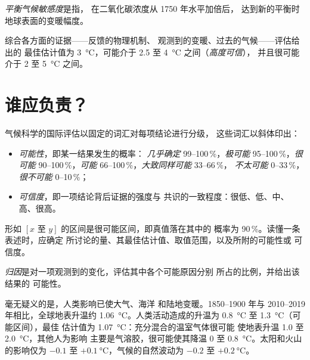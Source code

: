 \begin{definition}[平衡气候敏感度]\label{def:g12:climate-change:ecs}
\emph{平衡气候敏感度}是指，
在二氧化碳浓度从 1750 年水平加倍后，
达到新的平衡时地球表面的变暖幅度。
\end{definition}

\begin{proposition}[气候有多敏感？]\label{prop:g12:climate-change:ecs}
综合各方面的证据——反馈的物理机制、
观测到的变暖、过去的气候——评估给出的
最佳估计值为 \qty{3}{\degreeCelsius}，可能介于
2.5 至 \qty{4}{\degreeCelsius} 之间（\emph{高度可信}），
并且很可能介于 2 至 \qty{5}{\degreeCelsius} 之间。
\end{proposition}

\section{谁应负责？}

\begin{method}[解读评估中的表述]\label{met:g12:climate-change:language}
气候科学的国际评估以固定的词汇对每项结论进行分级，
这些词汇以斜体印出：
\begin{itemize}
  \item \emph{可能性}，即某一结果发生的概率：
        \emph{几乎确定} 99--100\,\%，\emph{极可能}
        95--100\,\%，\emph{很可能} 90--100\,\%，\emph{可能}
        66--100\,\%，\emph{大致同样可能} 33--66\,\%，
        \emph{不太可能} 0--33\,\%，\emph{很不可能} 0--10\,\%；
  \item \emph{可信度}，即一项结论背后证据的强度与
        共识的一致程度：很低、低、中、高、很高。
\end{itemize}
形如 $[x \text{ 至 } y]$ 的区间是很可能区间，即真值落在其中的
概率为 90\,\%。读懂一条表述时，应确定
所讨论的量、其最佳估计值、取值范围，以及所附的可能性或
可信度。
\end{method}

\begin{definition}[归因]\label{def:g12:climate-change:attribution}
\emph{归因}是对一项观测到的变化，评估其中各个可能原因分别
所占的比例，并给出该结果的
可能性。
\end{definition}

\begin{proposition}[人类影响]\label{prop:g12:climate-change:attribution}
毫无疑义的是，人类影响已使大气、海洋
和陆地变暖。1850--1900 年与 2010--2019 年相比，全球地表升温约
\qty{1.06}{\degreeCelsius}。人类活动造成的升温为
\qty{0.8}{\degreeCelsius} 至 \qty{1.3}{\degreeCelsius}（可能区间），最佳
估计值为 \qty{1.07}{\degreeCelsius}：充分混合的温室气体很可能
使地表升温 1.0 至 \qty{2.0}{\degreeCelsius}，其他人为影响
主要是气溶胶，很可能使其降温 0 至
\qty{0.8}{\degreeCelsius}。太阳和火山的影响仅为 $-0.1$
至 $+\qty{0.1}{\degreeCelsius}$，气候的自然波动为
$-0.2$ 至 $+\qty{0.2}{\degreeCelsius}$。
\end{proposition}

